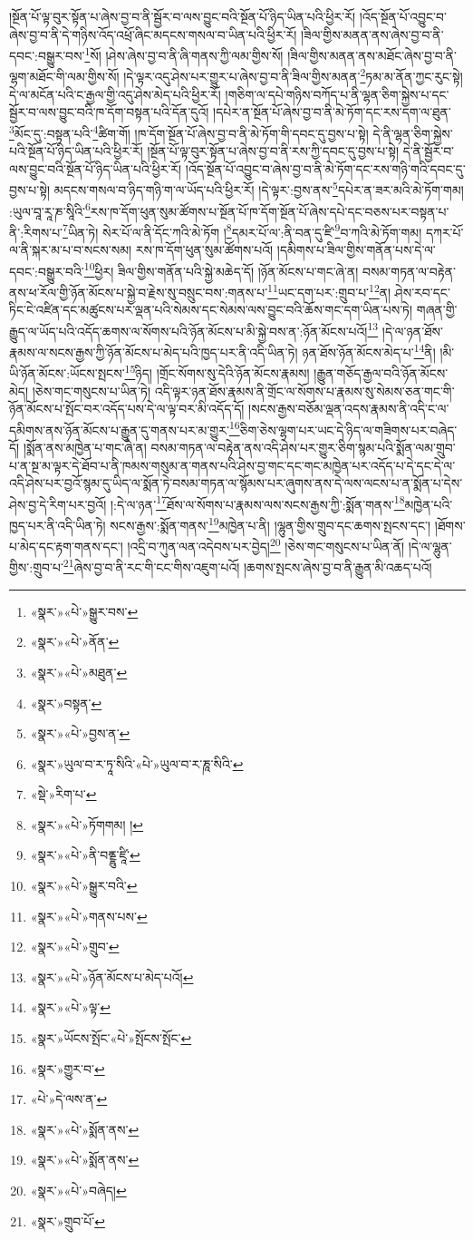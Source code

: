 །སྔོན་པོ་ལྟ་བུར་སྟོན་པ་ཞེས་བྱ་བ་ནི་སྦྱོར་བ་ལས་བྱུང་བའི་སྔོན་པོ་ཉིད་ཡིན་པའི་ཕྱིར་རོ། །འོད་སྔོན་པོ་འབྱུང་བ་ཞེས་བྱ་བ་ནི་དེ་གཉིས་འོད་འཕྲོ་ཞིང་མདངས་གསལ་བ་ཡིན་པའི་ཕྱིར་རོ། །ཟིལ་གྱིས་མནན་ནས་ཞེས་བྱ་བ་ནི་དབང་:བསྒྱུར་བས་\footnote{«སྣར་»«པེ་»སྒྱུར་བས་}སོ། །ཤེས་ཞེས་བྱ་བ་ནི་ཞི་གནས་ཀྱི་ལམ་གྱིས་སོ། །ཟིལ་གྱིས་མནན་ནས་མཐོང་ཞེས་བྱ་བ་ནི་ལྷག་མཐོང་གི་ལམ་གྱིས་སོ། །དེ་ལྟར་འདུ་ཤེས་པར་གྱུར་པ་ཞེས་བྱ་བ་ནི་ཟིལ་གྱིས་མནན་\footnote{«སྣར་»«པེ་»ནོན་}ཏམ་མ་ནོན་ཀྱང་རུང་སྟེ། དེ་ལ་མངོན་པའི་ང་རྒྱལ་གྱི་འདུ་ཤེས་མེད་པའི་ཕྱིར་རོ། །གཅིག་ལ་དཔེ་གཉིས་བཀོད་པ་ནི་ལྷན་ཅིག་སྐྱེས་པ་དང་སྦྱོར་བ་ལས་བྱུང་བའི་ཁ་དོག་བསྟན་པའི་དོན་དུའོ། །དཔེར་ན་སྔོན་པོ་ཞེས་བྱ་བ་ནི་མེ་ཏོག་དང་རས་དག་ལ་ཐུན་\footnote{«སྣར་»«པེ་»མཐུན་}མོང་དུ་:བསྟན་པའི་\footnote{«སྣར་»བསྟན་}ཚིག་གོ། །ཁ་དོག་སྔོན་པོ་ཞེས་བྱ་བ་ནི་མེ་ཏོག་གི་དབང་དུ་བྱས་པ་སྟེ། དེ་ནི་ལྷན་ཅིག་སྐྱེས་པའི་སྔོན་པོ་ཉིད་ཡིན་པའི་ཕྱིར་རོ། །སྔོན་པོ་ལྟ་བུར་སྟོན་པ་ཞེས་བྱ་བ་ནི་རས་ཀྱི་དབང་དུ་བྱས་པ་སྟེ། དེ་ནི་སྦྱོར་བ་ལས་བྱུང་བའི་སྔོན་པོ་ཉིད་ཡིན་པའི་ཕྱིར་རོ། །འོད་སྔོན་པོ་འབྱུང་བ་ཞེས་བྱ་བ་ནི་མེ་ཏོག་དང་རས་གཉི་གའི་དབང་དུ་བྱས་པ་སྟེ། མདངས་གསལ་བ་ཉིད་གཉི་ག་ལ་ཡོད་པའི་ཕྱིར་རོ། །དེ་ལྟར་:བྱས་ནས་\footnote{«སྣར་»«པེ་»བྱས་ན་}དཔེར་ན་ཟར་མའི་མེ་ཏོག་གམ། :ཡུལ་བཱ་རཱ་ཎ་སཱིའི་\footnote{«སྣར་»ཡུལ་བ་ར་ཏཱ་སིའི་«པེ་»ཡུལ་བ་ར་ཎཱ་སིའི་}རས་ཁ་དོག་ཕུན་སུམ་ཚོགས་པ་སྔོན་པོ་ཁ་དོག་སྔོན་པོ་ཞེས་དཔེ་དང་བཅས་པར་བསྟན་པ་ནི་:རིགས་པ་\footnote{«སྡེ་»རིག་པ་}ཡིན་ཏེ། སེར་པོ་ལ་ནི་དོང་ཀའི་མེ་ཏོག །\footnote{«སྣར་»«པེ་»ཏོགགམ། །}དམར་པོ་ལ་:ནི་བན་དུ་ཛི་\footnote{«སྣར་»«པེ་»ནི་བནྔྷུ་ཛཱི་}བ་ཀའི་མེ་ཏོག་གམ། དཀར་པོ་ལ་ནི་སྐར་མ་པ་བ་སངས་སམ། རས་ཁ་དོག་ཕུན་སུམ་ཚོགས་པའོ། །དམིགས་པ་ཟིལ་གྱིས་གནོན་པས་དེ་ལ་དབང་:བསྒྱུར་བའི་\footnote{«སྣར་»«པེ་»སྒྱུར་བའི་}ཕྱིར། ཟིལ་གྱིས་གནོན་པའི་སྐྱེ་མཆེད་དོ། །ཉོན་མོངས་པ་གང་ཞེ་ན། བསམ་གཏན་ལ་བརྟེན་ནས་ཕ་རོལ་གྱི་ཉོན་མོངས་པ་སྐྱེ་བ་རྗེས་སུ་བསྲུང་བས་:གནས་པ་\footnote{«སྣར་»«པེ་»གནས་པས་}ཡང་དག་པར་:གྲུབ་པ་\footnote{«སྣར་»«པེ་»གྲུབ་}ན། ཤེས་རབ་དང་ཏིང་ངེ་འཛིན་དང་མཚུངས་པར་ལྡན་པའི་སེམས་དང་སེམས་ལས་བྱུང་བའི་ཆོས་གང་དག་ཡིན་པས་ཏེ། གཞན་གྱི་རྒྱུད་ལ་ཡོད་པའི་འདོད་ཆགས་ལ་སོགས་པའི་ཉོན་མོངས་པ་མི་སྐྱེ་བས་ན་:ཉོན་མོངས་པའོ།\footnote{«སྣར་»«པེ་»ཉོན་མོངས་པ་མེད་པའོ།} །དེ་ལ་ཉན་ཐོས་རྣམས་ལ་སངས་རྒྱས་ཀྱི་ཉོན་མོངས་པ་མེད་པའི་ཁྱད་པར་ནི་འདི་ཡིན་ཏེ། ཉན་ཐོས་ཉོན་མོངས་མེད་པ་\footnote{«སྣར་»«པེ་»ལྟ་}ནི། །མི་ཡི་ཉོན་མོངས་:ཡོངས་སྤངས་\footnote{«སྣར་»ཡོངས་སྤོང་«པེ་»སྤོངས་སྤོང་}ཉིད། །གྲོང་སོགས་སུ་དེའི་ཉོན་མོངས་རྣམས། །རྒྱུན་གཅོད་རྒྱལ་བའི་ཉོན་མོངས་མེད། །ཅེས་གང་གསུངས་པ་ཡིན་ཏེ། འདི་ལྟར་ཉན་ཐོས་རྣམས་ནི་གྲོང་ལ་སོགས་པ་རྣམས་སུ་སེམས་ཅན་གང་གི་ཉོན་མོངས་པ་སྤོང་བར་འདོད་པས་དེ་ལ་ལྟ་བར་མི་འདོད་དོ། །སངས་རྒྱས་བཅོམ་ལྡན་འདས་རྣམས་ནི་འདི་ང་ལ་དམིགས་ནས་ཉོན་མོངས་པ་རྒྱུན་དུ་གནས་པར་མ་གྱུར་\footnote{«སྣར་»གྱུར་བ་}ཅིག་ཅེས་ལྷག་པར་ཡང་དེ་ཉིད་ལ་གཟིགས་པར་བཞེད་དོ། །སྨོན་ནས་མཁྱེན་པ་གང་ཞེ་ན། བསམ་གཏན་ལ་བརྟེན་ནས་འདི་ཤེས་པར་གྱུར་ཅིག་སྙམ་པའི་སྨོན་ལམ་གྲུབ་པ་ན་སྔ་མ་ལྟར་དེ་ཐོབ་པ་ནི་ཁམས་གསུམ་ན་གནས་པའི་ཤེས་བྱ་གང་དང་གང་མཁྱེན་པར་འདོད་པ་དེ་དང་དེ་ལ་འདི་ཤེས་པར་བྱའོ་སྙམ་དུ་ཡིད་ལ་སྨོན་ཏེ་བསམ་གཏན་ལ་སྙོམས་པར་ཞུགས་ནས་དེ་ལས་ལངས་པ་ན་སྨོན་པ་དེས་ཤེས་བྱ་དེ་རིག་པར་བྱའོ། །:དེ་ལ་ཉན་\footnote{«པེ་»དེ་ལས་ན་}ཐོས་ལ་སོགས་པ་རྣམས་ལས་སངས་རྒྱས་ཀྱི་:སྨོན་གནས་\footnote{«སྣར་»«པེ་»སྨོན་ནས་}མཁྱེན་པའི་ཁྱད་པར་ནི་འདི་ཡིན་ཏེ། སངས་རྒྱས་:སྨོན་གནས་\footnote{«སྣར་»«པེ་»སྨོན་ནས་}མཁྱེན་པ་ནི། །ལྷུན་གྱིས་གྲུབ་དང་ཆགས་སྤངས་དང་། །ཐོགས་པ་མེད་དང་རྟག་གནས་དང་། །འདྲི་བ་ཀུན་ལན་འདེབས་པར་བྱེད།\footnote{«སྣར་»«པེ་»བཞེད།} །ཅེས་གང་གསུངས་པ་ཡིན་ནོ། །དེ་ལ་ལྷུན་གྱིས་:གྲུབ་པ་\footnote{«སྣར་»གྲུབ་པོ་}ཞེས་བྱ་བ་ནི་རང་གི་ངང་གིས་འཇུག་པའོ། །ཆགས་སྤངས་ཞེས་བྱ་བ་ནི་རྒྱུན་མི་འཆད་པའོ། 